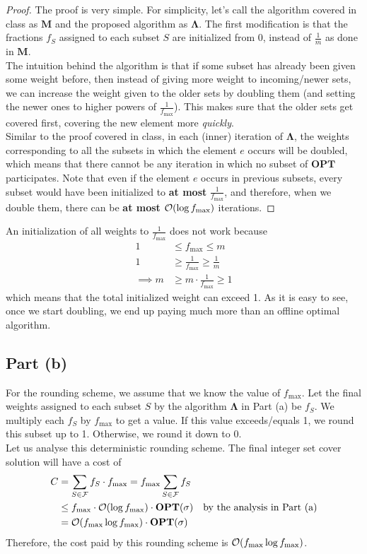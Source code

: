 \documentclass[11pt]{article}
\newcommand{\bigO}{{\cal O}}
\begin{document}
\begin{proof}
    The proof is very simple. For simplicity, let's call the algorithm covered in class as
    $\mathbf{M}$ and the proposed algorithm as $\mathbf{\Lambda}$. The first modification is that the fractions $f_{S}$ assigned to each subset $S$ are initialized from 0,
    instead of $\frac{1}{m}$ as done in $\mathbf{M}$. \\
    The intuition behind the algorithm is that if some subset has already been given some weight before,
    then instead of giving more weight to incoming/newer sets, we can increase the weight given to the older sets
    by doubling them (and setting the newer ones to higher powers of $\frac{1}{f_{\max}}$). This
    makes sure that the older sets get covered first, covering the new element more \textit{quickly}. \\
    Similar to the proof covered in class, in each (inner) iteration of $\mathbf{\Lambda}$,
    the weights corresponding to all the subsets in which the element $e$ occurs will be doubled,
    which means that there cannot be any iteration in which no subset of $\mathbf{OPT}$ participates.
    Note that even if the element $e$ occurs in previous subsets, every subset would have been initialized
    to \textbf{at most} $\frac{1}{f_{\max}}$, and therefore, when we double them, there can be \textbf{at most}
    $\bigO(\log{f_{\max}})$ iterations.
\end{proof}
An initialization of all weights to $\frac{1}{f_{\max}}$ does not work because
\begin{align}
    1 &\leq f_{\max} \leq m \\
    1 &\geq \frac{1}{f_{\max}} \geq \frac{1}{m} \\
    \implies m &\geq m \cdot \frac{1}{f_{\max}} \geq 1
\end{align}
which means that the total initialized weight can exceed 1. As it is easy to see, once we start doubling,
we end up paying much more than an offline optimal algorithm.

\subsection*{Part (b)}
For the rounding scheme, we assume that we know the value of $f_{\max}$. Let the final
weights assigned to each subset $S$ by the algorithm $\mathbf{\Lambda}$ in Part (a) be $f_{S}$.
We multiply each $f_{S}$ by $f_{\max}$ to get a value. If this value exceeds/equals 1, we round this subset up to 1.
Otherwise, we round it down to 0. \\
Let us analyse this deterministic rounding scheme. The final integer set cover solution
will have a cost of
\begin{align}
    C &= \sum_{S \in \mathcal{F}} f_{S} \cdot f_{\max} = f_{\max} \sum_{S \in \mathcal{F}} f_{S} \\
    &\leq f_{\max} \cdot \bigO(\log{f_{\max}}) \cdot \mathbf{OPT}(\sigma) \quad \text{by the analysis in Part (a)} \\
    &= \bigO(f_{\max} \log{f_{\max}}) \cdot \mathbf{OPT}(\sigma)
\end{align}
Therefore, the cost paid by this rounding scheme is $\bigO(f_{\max} \log{f_{\max}})$.
\end{document}
